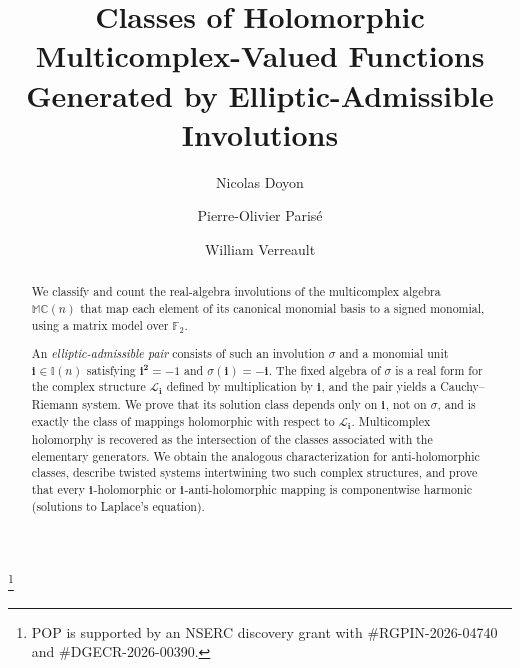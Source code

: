 \documentclass[12pt]{amsart}
\theoremstyle{plain}
\theoremstyle{definition}
\numberwithin{equation}{section}
\newcommand{\im}[1]{\mathbf{ i_{#1}}}
\newcommand{\ims}[1]{\mathbf{ i_{#1}^2}}
\newcommand{\mC}{\mathbb{C}}
\newcommand{\mM}{\mathbb{M}}
\newcommand{\mI}{\mathbb{I}}
\newcommand{\cL}{\mathcal{L}}
\begin{document}
\title[Cauchy--Riemann Equations and Involutions]{Classes of Holomorphic Multicomplex-Valued Functions Generated by Elliptic-Admissible Involutions}

\author{Nicolas Doyon}
\address{Nicolas Doyon: Département de mathématiques et de statistique, Université Laval, Quebec City, QC, G1V 0A6, Canada}


\author{Pierre-Olivier Paris\'e}
\address{Pierre-Olivier Parisé: Département de mathématiques et d'informatique, Université du Québec à Trois-Rivières,
Trois-Rivières, QC, G8Z 4M3, Canada}
\thanks{POP is supported by an NSERC discovery grant with {\#}RGPIN-2026-04740 and {\#}DGECR-2026-00390.}

\author{William Verreault}
\address{
William Verreault: Department of Mathematics, University of Toronto, Toronto, ON, M5S 2E4, Canada}

\begin{abstract}
We classify and count the real-algebra involutions of the multicomplex
algebra $\mM\mC(n)$ that map each element of its canonical monomial
basis to a signed monomial, using a matrix model over $\mathbb F_2$.

An \emph{elliptic-admissible pair} consists of such an involution
$\sigma$ and a monomial unit $\im{}\in\mI(n)$ satisfying
$\ims{}=-1$ and $\sigma(\im{})=-\im{}$. The fixed algebra of $\sigma$
is a real form for the complex structure $\cL_{\im{}}$ defined by
multiplication by $\im{}$, and the pair yields a Cauchy--Riemann system.
We prove that its solution class depends only on $\im{}$, not on
$\sigma$, and is exactly the class of mappings holomorphic with respect
to $\cL_{\im{}}$. Multicomplex holomorphy is recovered as the
intersection of the classes associated with the elementary generators.
We obtain the analogous characterization for anti-holomorphic classes,
describe twisted systems intertwining two such complex structures, and
prove that every $\im{}$-holomorphic or $\im{}$-anti-holomorphic
mapping is componentwise harmonic (solutions to Laplace's equation).
\end{abstract}


\end{document}
